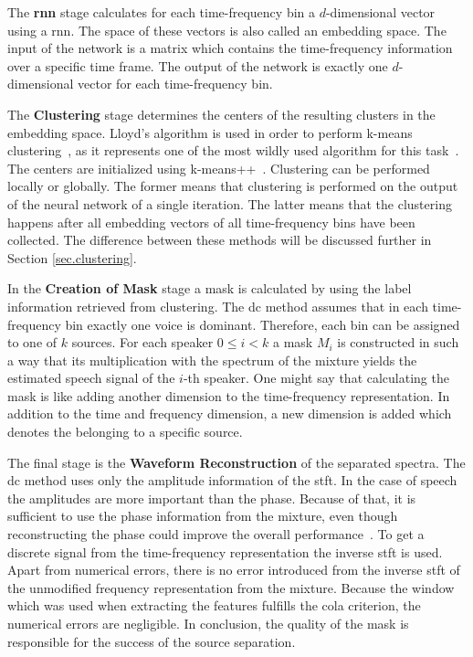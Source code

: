 The \textbf{\gls{rnn}} stage calculates for each time-frequency bin a $d$-dimensional vector using a \gls{rnn}. The space of these vectors is also called an embedding space.
The input of the network is a matrix which contains the time-frequency information over a specific time frame.
The output of the network is exactly one $d$-dimensional vector for each time-frequency bin.

The \textbf{Clustering} stage determines the centers of the resulting clusters in the embedding space. Lloyd's algorithm is used in order to perform k-means clustering~\cite{Lloyd1982}, as it represents one of the most wildly used algorithm for this task~\cite{Berkhin2002}.
The centers are initialized using k-means++~\cite{Arthur2007}. Clustering can be performed locally or globally. The former means that clustering is performed on the output of the neural network of a single iteration. The latter means that the clustering happens after all embedding vectors of all time-frequency bins have been collected. The difference between these methods will be discussed further in Section \ref{sec.clustering}.

In the \textbf{Creation of Mask} stage a mask is calculated by using the label information retrieved from clustering. The \gls{dc} method assumes that in each time-frequency bin exactly one voice is dominant. Therefore, each bin can be assigned to one of $k$ sources. For each speaker $0 \le i < k$ a mask $M_i$ is constructed in such a way that its multiplication with the spectrum of the mixture yields the estimated speech signal of the $i$-th speaker.
One might say that calculating the mask is like adding another dimension to the time-frequency representation. In addition to the time and frequency dimension, a new dimension is added which denotes the belonging to a specific source.

The final stage is the \textbf{Waveform Reconstruction} of the separated spectra. The \gls{dc} method uses only the amplitude information of the \gls{stft}.
In the case of speech the amplitudes are more important than the phase.
Because of that, it is sufficient to use the phase information from the mixture, even though reconstructing the phase could improve the overall performance~\cite[p.11]{Wang2018b}.
To get a discrete signal from the time-frequency representation the inverse \gls{stft} is used.
Apart from numerical errors, there is no error introduced from the inverse \gls{stft} of the unmodified frequency representation from the mixture. Because the window which was used when extracting the features fulfills the \gls{cola} criterion, the numerical errors are negligible.
In conclusion, the quality of the mask is responsible for the success of the source separation.


